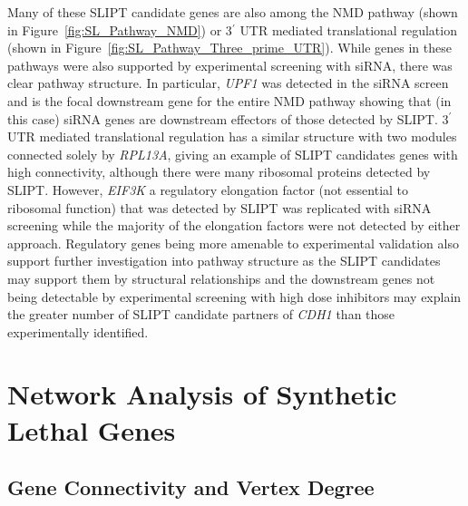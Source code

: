 Many of these \gls{SLIPT} candidate genes are also among the \gls{NMD} pathway (shown in Figure~\ref{fig:SL_Pathway_NMD}) or 3$^\prime$ \gls{UTR} mediated translational regulation (shown in Figure~\ref{fig:SL_Pathway_Three_prime_UTR}). While genes in these pathways were also supported by experimental screening with \gls{siRNA}, there was clear pathway structure. In particular, \textit{UPF1} was detected in the \gls{siRNA} screen and is the focal downstream gene for the entire \gls{NMD} pathway showing that (in this case) \gls{siRNA} genes are downstream effectors of those detected by \gls{SLIPT}.  3$^\prime$ \gls{UTR} mediated translational regulation has a similar structure with two modules connected solely by \textit{RPL13A}, giving an example of \gls{SLIPT} candidates genes with high connectivity, although there were many ribosomal proteins detected by \gls{SLIPT}. However, \textit{EIF3K} a regulatory elongation factor (not essential to ribosomal function) that was detected by \gls{SLIPT} was replicated with \gls{siRNA} screening while the majority of the elongation factors were not detected by either approach. Regulatory genes being more amenable to experimental validation also support further investigation into pathway structure as the \gls{SLIPT} candidates may support them by structural relationships and the downstream genes not being detectable by experimental screening with high dose inhibitors may explain the greater number of \gls{SLIPT} candidate partners of \textit{CDH1} than those experimentally identified.


\FloatBarrier

\section{Network Analysis of Synthetic Lethal Genes}   \label{chapt4:Network_Test}


\FloatBarrier

\subsection{Gene Connectivity and Vertex Degree}  \label{chapt4:Network_Vertex_Degree}



\begin{figure*}[!htp]
\begin{mdframed}
  \begin{center}
  \resizebox{0.95 \textwidth}{!}{
    \fbox{
    \texttt{[image: \{"/home/tomkelly/Downloads/Pathway\_Structure/Centrality\_exprSL/Pi3K\_network\_vertex\_degree".pdf]}}
   }
   }
   \end{center}
   \caption[Synthetic Lethality and Vertex Degree]{\small \textbf{Synthetic Lethality and Vertex Degree.} Synthetic Lethality and Vertex Degree
}
\label{fig:SL_Pathway_PI3K_Vertex_Degree}
\end{mdframed}
\end{figure*}

